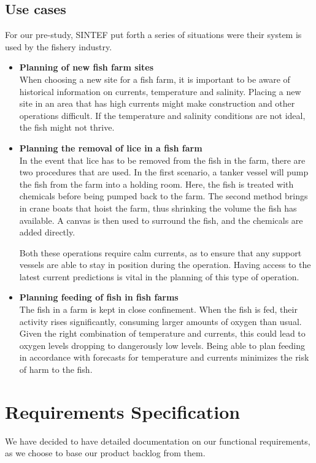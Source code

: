 \documentclass[11pt,a4paper,titlepage,oneside]{report}
\begin{document}
  \subsection{Use cases}
	For our \gls{pre-study}, SINTEF put forth a series of situations were their system is used by the fishery industry. 
	\begin{itemize}
		\item \textbf{Planning of new fish farm sites} \\
		When choosing a new site for a fish farm, it is important to be aware of historical information on currents, temperature and salinity. Placing a new site in an area that has high currents might make construction and other operations difficult. If the temperature and salinity conditions are not ideal, the fish might not thrive. 
		\item \textbf{Planning the removal of lice in a fish farm} \\
		In the event that lice has to be removed from the fish in the farm, there are two procedures that are used. In the first scenario, a tanker vessel will pump the fish from the farm into a holding room. Here, the fish is treated with chemicals before being pumped back to the farm. The second method brings in crane boats that hoist the farm, thus shrinking the volume the fish has available. A canvas is then used to surround the fish, and the chemicals are added directly. 

		Both these operations require calm currents, as to ensure that any support vessels are able to stay in position during the operation. Having access to the latest current predictions is vital in the planning of this type of operation.
		\item \textbf{Planning feeding of fish in fish farms} \\
		The fish in a farm is kept in close confinement. When the fish is fed, their activity rises significantly, consuming larger amounts of oxygen than usual. Given the right combination of temperature and currents, this could lead to oxygen levels dropping to dangerously low levels. Being able to plan feeding in accordance with forecasts for temperature and currents minimizes the risk of harm to the fish.
	\end{itemize}

\section{Requirements Specification}
\label{reqspec}
We have decided to have detailed documentation on our functional requirements, as we choose to base our product backlog from them.
\end{document}
